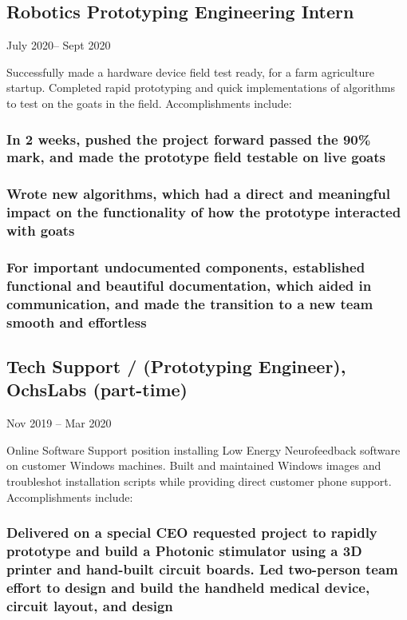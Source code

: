 \documentclass{article}
\begin{document}
    \subsection{Robotics Prototyping Engineering Intern} July 2020– Sept 2020
            
        \vspace{0mm}
        Successfully made a hardware device field test ready, for a farm agriculture startup. Completed rapid prototyping and quick implementations of algorithms to test on the goats in the field.  Accomplishments include:
        
        \subsubsection{In 2 weeks, pushed the project forward passed the 90\% mark, and made the prototype field testable on live goats}
        
        \subsubsection{Wrote new algorithms, which had a direct and meaningful impact on the functionality of how the prototype interacted with goats}
        
        \subsubsection{For important undocumented components, established functional and beautiful documentation, which aided in communication, and made the transition to a new team smooth and effortless}

	 
    \subsection{Tech Support / (Prototyping Engineer), OchsLabs (part-time)} Nov 2019 – Mar 2020
	    
	    \vspace{0mm}
    	Online Software Support position installing Low Energy Neurofeedback software on customer Windows machines. Built and maintained Windows images and troubleshot installation scripts while providing direct customer phone support. Accomplishments include:

        \vspace{-2mm}
        \subsubsection{Delivered on a special CEO requested project to rapidly prototype and build a Photonic stimulator using a 3D printer and hand-built circuit boards. Led two-person team effort to design and build the handheld medical device, circuit layout, and design}
\end{document}
